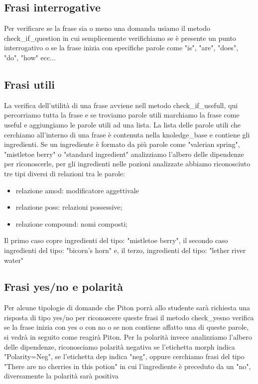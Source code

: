 \subsection{Frasi interrogative}
Per verificare se la frase sia o meno una domanda usiamo il metodo check\_if\_question in cui semplicemente verifichiamo se è presente un punto interrogativo o se la frase inizia con specifiche parole come "is", "are", "does", "do", "how" ecc...
\subsection{Frasi utili}
La verifica dell'utilità di una frase avviene nell metodo check\_if\_usefull, qui percorriamo tutta la frase e se troviamo parole utili  marchiamo la frase come useful e aggiungiamo le parole utili ad una lista. La lista delle parole utili che cerchiamo all'interno di una frase è contenuta nella knoledge\_base e contiene gli ingredienti. Se un ingrediente è formato da più parole come "valerian spring", "mistletoe berry" o  "standard ingredient" analizziamo l'albero delle dipendenze per riconoscerle, per gli ingredienti nelle pozioni analizzate abbiamo riconosciuto tre tipi diversi di relazioni tra le parole:
\begin{itemize}
    \item relazione amod: modificatore aggettivale
    \item relazione poss: relazioni possessive;
    \item relazione compound: nomi composti;
\end{itemize}
Il primo caso copre ingredienti del tipo: "mistletoe berry",
il secondo caso ingredienti del tipo: "bicorn's horn" e, il terzo, ingredienti del tipo: "lether river water"
\subsection{Frasi yes/no e polarità}
Per alcune tipologie di domande che Piton porrà allo studente sarà richiesta una risposta di tipo yes/no per riconoscere queste frasi il metodo check\_yesno verifica se la frase inizia con yes o con no o se non contiene affatto una di queste parole, si vedrà in seguito come reagirà Piton.
Per la polarità invece analizziamo l'albero delle dipendenze, riconosciamo polarità negativa se l'etichetta morph indica "Polarity=Neg", se l'etichetta dep indica "neg", oppure cerchiamo frasi del tipo "There are no cherries in this potion" in cui l'ingrediente è preceduto da un "no", diversamente la polarità sarà positiva
